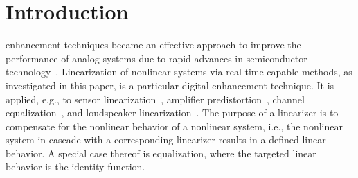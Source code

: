 \documentclass[10pt,twocolumn,twoside]{IEEEtran}
\begin{document}
\IEEEpeerreviewmaketitle


\section{Introduction}
	\label{intro}

 enhancement techniques became an effective
approach to improve the performance of analog systems due to rapid
advances in semiconductor technology~\cite{murmann2008}.
Linearization of nonlinear systems via real-time capable methods, as investigated in this paper,
is a particular digital enhancement technique. It is applied, e.g.,
to sensor linearization~\cite{zhuang2004}, amplifier predistortion~\cite{morgan2006},
channel equalization~\cite{benedetto1983}, and loudspeaker linearization~\cite{lashkari2006}.
The purpose of a linearizer is to compensate for the nonlinear behavior
of a nonlinear system, i.e., the nonlinear system in cascade with a
corresponding linearizer results in a defined linear behavior.
A special case thereof is equalization, where the targeted linear
behavior is the identity function.
\end{document}
